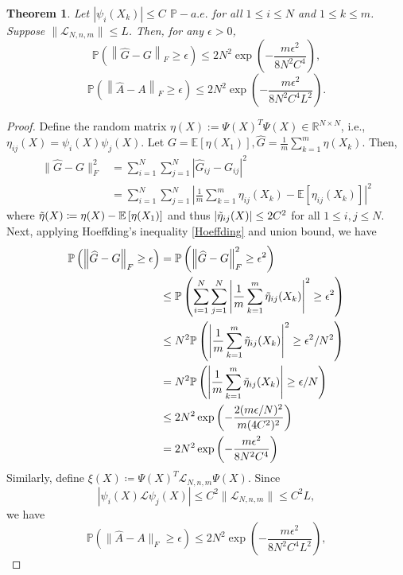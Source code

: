 \documentclass{article}[11]
\newtheorem{theorem}{Theorem}
\begin{document}
	\begin{theorem}\label{Gramian_estimation}
		Let $| \psi_i(X_k) | \leq C$ $\mathbb{P}-a.e.$ for all $ 1 \leq i \leq N$ and $1 \leq k \leq m$. Suppose $\| \mathcal{L}_{N,n,m} \| \leq L$. Then, for any $\epsilon>0$, 
		\[
		\mathbb{P} \left( \left\| \widehat{G} - G \right\|_F \geq \epsilon \right) \leq 2N^2 \exp \left( -\frac{m \epsilon^2}{8 N^2 C^4} \right),
		\]
		\[
		\mathbb{P} \left( \left\| \widehat{A} - A \right\|_F \geq \epsilon \right) \leq 2N^2 \exp \left( -\frac{m\epsilon^2}{8 N^2 C^4 L^2} \right).
		\]
	\end{theorem}
	\begin{proof}
		Define the random matrix $\eta(X):= \Psi(X)^T \Psi(X) \in \mathbb{R}^{N \times N}$, i.e., $\eta_{ij}(X) = \psi_i(X)\psi_j(X)$. Let $G = \mathbb{E}[\eta(X_1)], \widehat{G} = \frac{1}{m}\sum_{k=1}^{m} \eta(X_k)$. Then, 
		\begin{align*}
			\| \widehat{G} - G \|_F^2 &= \sum_{i=1}^{N}\sum_{j=1}^{N} \left| \widehat{G}_{ij} - G_{ij} \right|^2 \\
			&= \sum_{i=1}^{N}\sum_{j=1}^{N} \left| \frac{1}{m}\sum_{k=1}^m \eta_{ij}(X_k) - \mathbb{E}\left[\eta_{ij}(X_k)\right] \right|^2
		\end{align*}
		where $\Tilde{\eta}(X) \coloneqq \eta(X) - \mathbb{E}\left[\eta(X_1)\right]$ and thus $\left| \Tilde{\eta}_{ij}(X) \right| \leq 2C^2$ for all $1 \leq i,j \leq N$.
		Next, applying Hoeffding's inequality \eqref{Hoeffding} and union bound, we have
		\begin{align*}
			\mathbb{P} \left( \left\| \widehat{G} - G \right\|_F \geq \epsilon \right) &= \mathbb{P} \left( \left\| \widehat{G} - G \right\|_F^2 \geq \epsilon^2 \right) \\
			&\leq \mathbb{P} \left( \sum_{i=1}^{N}\sum_{j=1}^{N} \left| \frac{1}{m} \sum_{k=1}^m \Tilde{\eta}_{ij}(X_k) \right|^2 \geq \epsilon^2 \right) \\
			&\leq N^2 \mathbb{P} \left( \left| \frac{1}{m} \sum_{k=1}^m \Tilde{\eta}_{ij}(X_k) \right|^2 \geq \epsilon^2/N^2 \right) \\
			&= N^2 \mathbb{P} \left( \left| \frac{1}{m} \sum_{k=1}^m \Tilde{\eta}_{ij}(X_k) \right| \geq \epsilon/N \right) \\
			&\leq 2N^2 \exp \left( -\frac{2(m\epsilon/N)^2}{m(4C^2)^2} \right) \\
			&= 2N^2 \exp \left( -\frac{m \epsilon^2}{8 N^2 C^4} \right)
		\end{align*}
		Similarly, define $\xi(X) \coloneqq \Psi(X)^T \mathcal{L}_{N,n,m}\Psi(X)$. Since 
		\[ |\psi_i(X) \mathcal{L} \psi_j(X)| \leq C^2\|\mathcal{L}_{N,n,m}\| \leq C^2 L, \]
		we have
		\[ \mathbb{P} \left( \| \widehat{A} - A \|_F \geq \epsilon \right) \leq 2 N^2 \exp \left( -\frac{m\epsilon^2}{8 N^2 C^4 L^2} \right), \]
	\end{proof}
	
\end{document}
